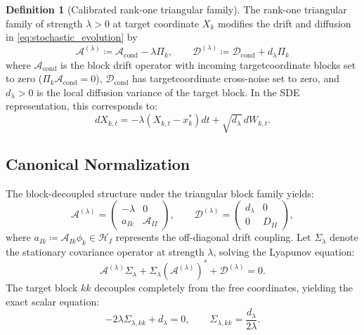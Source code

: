 \documentclass[preprint,12pt]{elsarticle}
\theoremstyle{plain}
\theoremstyle{definition}
\newtheorem{definition}[theorem]{Definition}
\theoremstyle{remark}
\newcommand{\cond}{\operatorname{cond}}
\begin{document}
    \begin{definition}[Calibrated rank-one triangular family]
        \label{def:soft_do}
        The rank-one triangular family of strength $\lambda > 0$ at target
        coordinate $X_k$ modifies the drift and diffusion in
        \eqref{eq:stochastic_evolution} by
        \begin{equation}
            \label{eq:soft_do_sde}
            \mathcal{A}^{(\lambda)} \coloneqq \mathcal{A}_{\cond} - \lambda \Pi_k, \qquad
            \mathcal{D}^{(\lambda)} \coloneqq \mathcal{D}_{\cond} + d_\lambda \Pi_k
        \end{equation}
        where $\mathcal{A}_{\cond}$ is the block drift operator with incoming target\-co\-or\-di\-nate blocks set to zero ($\Pi_k \mathcal{A}_{\cond} = 0$), $\mathcal{D}_{\cond}$ has target\-co\-or\-di\-nate cross-noise set to zero, and $d_\lambda > 0$ is the local diffusion variance of the target block. In the SDE representation, this corresponds to:
        \begin{equation}
            \label{eq:soft_do_sde_general}
            dX_{k,t} = -\lambda (X_{k,t} - x_k^*) dt + \sqrt{d_\lambda}\, dW_{k,t}.
        \end{equation}
    \end{definition}

    \subsection{Canonical Normalization}
    \label{sec:setup:calibration}

    The block-decoupled structure under the triangular block family yields:
    \begin{equation}
        \label{eq:block_decoupled_drift_diffusion}
        \mathcal{A}^{(\lambda)}=
    \begin{pmatrix}-\lambda&0\\a_{Ik}&\mathcal{A}_{II}\end{pmatrix},\qquad
        \mathcal{D}^{(\lambda)}=
    \begin{pmatrix}d_\lambda&0\\0&D_{II}\end{pmatrix},
    \end{equation}
    where $a_{Ik} \coloneqq \mathcal{A}_{Ik} \phi_k \in \mathcal{H}_I$ represents the off-diagonal drift coupling.
    Let $\Sigma_\lambda$ denote the stationary covariance operator at strength
    $\lambda$, solving the Lyapunov equation:
    \begin{equation}
        \label{eq:stationary_lyapunov_regularized}
        \mathcal{A}^{(\lambda)}\Sigma_\lambda + \Sigma_\lambda(\mathcal{A}^{(\lambda)})^* + \mathcal{D}^{(\lambda)} = 0.
    \end{equation}
    The target block $kk$ decouples completely from the free coordinates, yielding the exact scalar equation:
    \begin{equation}
        \label{eq:target_scalar_lyapunov}
        -2\lambda\Sigma_{\lambda,kk} + d_\lambda = 0,
        \qquad
        \Sigma_{\lambda,kk} = \frac{d_\lambda}{2\lambda}.
    \end{equation}
\end{document}
